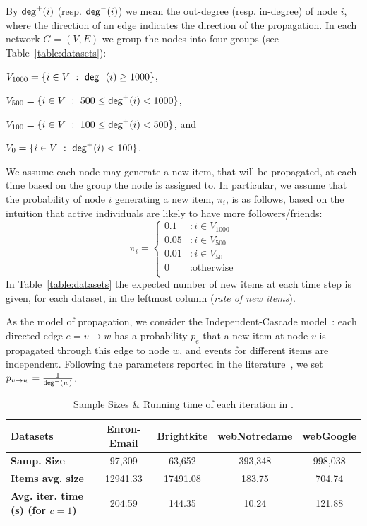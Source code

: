 By $\mathsf{deg}^+(i)$ (resp. $\mathsf{deg}^-(i)$) we mean the out-degree (resp.
in-degree) of node $i$, where the direction of an edge indicates the direction
of the propagation. In each network $G=(V,E)$ we group the nodes into four
groups (see Table~\ref{table:datasets}):
\begin{itemize*}
 \item $V_{1000} = \{i\in V ~:~ \mathsf{deg}^+(i) \geq 1000\}$,
 \item $V_{500}  = \{i\in V ~:~ 500\leq \mathsf{deg}^+(i) < 1000\}$,
 \item $V_{100}  = \{i\in V ~:~ 100\leq \mathsf{deg}^+(i) < 500\}$, and
 \item $V_{0}    = \{i\in V ~:~ \mathsf{deg}^+(i) < 100\}$.
\end{itemize*}
We assume each node may generate a new item, that will be propagated, at each
time based on the group the node is assigned to. In particular, we assume that
the probability of  node $i$ generating a new item, $\pi_i$, is as follows,
based on the intuition that active individuals are  likely to have more
followers/friends:
$$
   \pi_i = \left\{
     \begin{array}{ll}
       0.1 &: i \in V_{1000}\\
       0.05 &: i \in V_{500} \\
       0.01 &: i \in V_{50} \\
       0 & : \text{otherwise} \\
     \end{array}
   \right.
$$
 In Table~\ref{table:datasets} the expected number of new items at each time
 step is given, for each dataset, in the leftmost column (\emph{rate of new
 items}).

As the model of propagation, we consider the Independent-Cascade
model~\cite{Kempe2003}:  each directed edge $e=v\rightarrow w$ has a probability
$p_e$ that a new item at node $v$ is propagated through this edge to node $w$,
and events for different items are independent. Following the parameters
reported in the
literature~\cite{Kempe2003,Chen2009,Chen2010,jung2011irie,tang2014influence}, we
set $p_{v\rightarrow w} = \frac{1}{\mathsf{deg}^-(w)}$.




\begin{table}[htb]
\begin{tabular}{|l|c|c|c|c|}
\hline
{\bf Datasets}& Enron-Email & Brightkite & webNotredame & webGoogle\\
\hline \hline
{\bf Samp. Size}& 97,309 & 63,652 & 393,348 & 998,038 \\
\hline
{\bf Items avg. size}& 12941.33 & 17491.08 & 183.75 & 704.74\\
\hline
{\bf Avg. iter. time (s) (for $c=1$)}& 204.59 &  144.35&  10.24& 121.88\\
\hline
\end{tabular}
\caption{Sample Sizes \& Running time of each iteration in \algonameapx.}\label{table:time}
\end{table}

